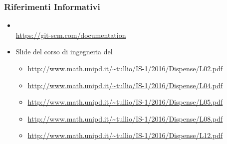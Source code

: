 	    \subsubsection{Riferimenti Informativi}
        \begin{itemize}
        \item {} \\
        \url{https://git-scm.com/documentation}
         \item Slide del corso di ingegneria del 
          \begin{itemize}
           \item \url{http://www.math.unipd.it/~tullio/IS-1/2016/Dispense/L02.pdf}
           \item \url{http://www.math.unipd.it/~tullio/IS-1/2016/Dispense/L04.pdf}
           \item \url{http://www.math.unipd.it/~tullio/IS-1/2016/Dispense/L05.pdf}
           \item \url{http://www.math.unipd.it/~tullio/IS-1/2016/Dispense/L08.pdf}
           \item \url{http://www.math.unipd.it/~tullio/IS-1/2016/Dispense/L12.pdf}
          \end{itemize}
        \end{itemize}

